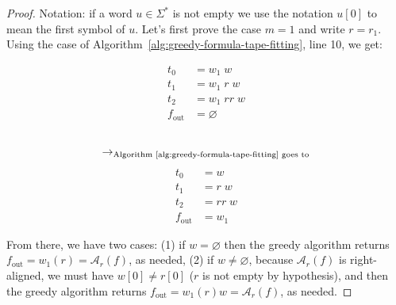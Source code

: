 \begin{proof}
    Notation: if a word $u\in\Sigma^*$ is not empty we use the notation $u[0]$ to mean the first symbol of $u$.
    Let's first prove the case $m=1$ and write $r = r_1$. Using the case of Algorithm~\ref{alg:greedy-formula-tape-fitting}, line 10, we get:
    \setlength{\columnsep}{-7.5cm}
    \begin{multicols}{3}
        \noindent
        \begin{align*}
            t_0          & = w_1\;  w      \\
            t_1          & = w_1\; r\;  w  \\
            t_2          & = w_1\; r r\; w \\
            f_\text{out} & = \varnothing
        \end{align*}
        \begin{align*}
             & \\
            \to_{\text{Algorithm~\ref{alg:greedy-formula-tape-fitting} goes to}}
        \end{align*}
        \begin{align*}
            t_0          & = w        \\
            t_1          & = r\;  w   \\
            t_2          & = r r\;  w \\
            f_\text{out} & = w_1
        \end{align*}
    \end{multicols}
    From there, we have two cases: (1) if $w = \varnothing$ then the greedy algorithm returns $f_\text{out} = w_1 (r) = \mathcal{A}_r(f)$, as needed, (2) if $w \neq \varnothing$, because $\mathcal{A}_r(f)$ is right-aligned, we must have $w[0] \neq r[0]$ ($r$ is not empty by hypothesis), and then the greedy algorithm returns $f_\text{out} = w_1 (r) w = \mathcal{A}_r(f)$, as needed.



\end{proof}
